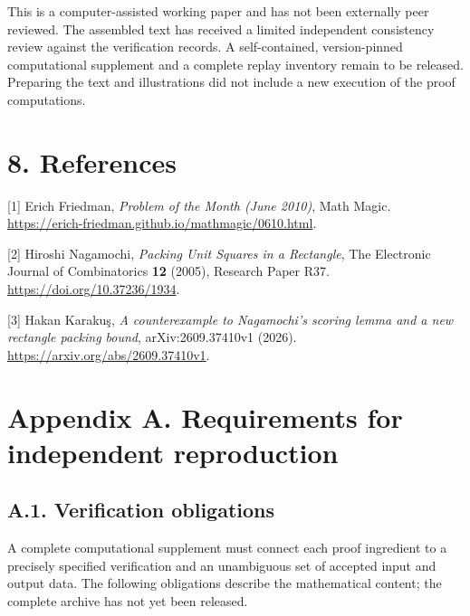 \documentclass[
  11pt,
  a4paper,
]{article}
\begin{document}
This is a computer-assisted working paper and has not been externally
peer reviewed. The assembled text has received a limited independent
consistency review against the verification records. A self-contained,
version-pinned computational supplement and a complete replay inventory
remain to be released. Preparing the text and illustrations did not
include a new execution of the proof computations.

\section{8. References}\label{references}

{[}1{]} Erich Friedman, \emph{Problem of the Month (June 2010)}, Math
Magic. \url{https://erich-friedman.github.io/mathmagic/0610.html}.

{[}2{]} Hiroshi Nagamochi, \emph{Packing Unit Squares in a Rectangle},
The Electronic Journal of Combinatorics \textbf{12} (2005), Research
Paper R37. \url{https://doi.org/10.37236/1934}.

{[}3{]} Hakan Karakuş, \emph{A counterexample to Nagamochi's scoring
lemma and a new rectangle packing bound}, arXiv:2609.37410v1 (2026).
\url{https://arxiv.org/abs/2609.37410v1}.

\fontsize{9.5}{10.8}\selectfont
\section{Appendix A. Requirements for independent
reproduction}\label{appendix-a.-requirements-for-independent-reproduction}

\subsection{A.1. Verification
obligations}\label{a.1.-verification-obligations}

A complete computational supplement must connect each proof ingredient
to a precisely specified verification and an unambiguous set of accepted
input and output data. The following obligations describe the
mathematical content; the complete archive has not yet been released.
\end{document}

